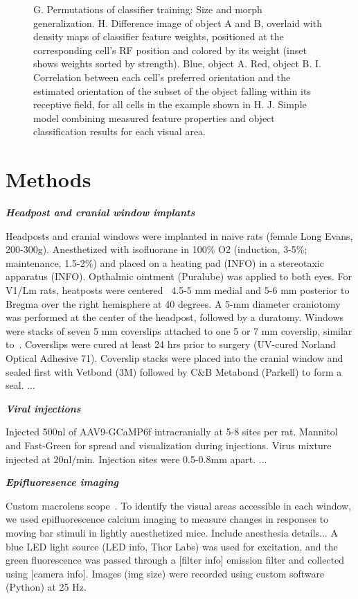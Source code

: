 \documentclass{article}
\begin{document}
\begin{figure}[ht]
  G.  Permutations of classifier training:  Size and morph generalization.
  H.  Difference image of object A and B, overlaid with density maps of classifier feature weights, positioned at the corresponding cell’s RF position and colored by its weight (inset shows weights sorted by strength).  Blue, object A. Red, object B.
  I.  Correlation between each cell’s preferred orientation and the estimated orientation of the subset of the object falling within its receptive field, for all cells in the example shown in H.
  J.  Simple model combining measured feature properties and object classification results for each visual area.
  \label{fig:fig5}
\end{figure}

\section{Methods}
\textbf{\textit{Headpost and cranial window implants}}

Headposts and cranial windows were implanted in naive rats (female Long Evans, 200-300g). Anesthetized with isofluorane in 100\% O2 (induction, 3-5\%; maintenance, 1.5-2\%) and placed on a heating pad (INFO) in a stereotaxic apparatus (INFO). Opthalmic ointment (Puralube) was applied to both eyes. For V1/Lm rats, heatposts were centered ~4.5-5 mm medial and 5-6 mm posterior to Bregma over the right hemisphere at 40 degrees. A 5-mm diameter craniotomy was performed at the center of the headpost, followed by a duratomy. Windows were stacks of seven 5 mm coverslips attached to one 5 or 7 mm coverslip, similar to~\cite{andermannsurgery, anotherone}. Coverslips were cured at least 24 hrs prior to surgery (UV-cured Norland Optical Adhesive 71).  Coverslip stacks were placed into the cranial window and sealed first with Vetbond (3M) followed by C&B Metabond (Parkell) to form a seal.  ...

\textbf{\textit{Viral injections}}

Injected 500nl of AAV9-GCaMP6f intracranially at 5-8 sites per rat. Mannitol and Fast-Green for spread and visualization during injections. Virus mixture injected at 20nl/min. Injection sites were 0.5-0.8mm apart. ...

\textbf{\textit{Epifluoresence imaging}}

Custom macrolens scope~\cite{GrinwaldMacro}. To identify the visual areas accessible in each window, we used epifluorescence calcium imaging to measure changes in responses to moving bar stimuli in lightly anesthetized mice. Include anesthesia details... A blue LED light source (LED info, Thor Labs) was used for excitation, and the green fluorescence was passed through a [filter info] emission filter and collected using [camera info].  Images (img size) were recorded using custom software (Python) at 25 Hz.
\end{document}
